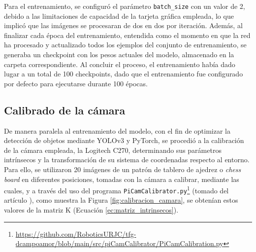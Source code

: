 Para el entrenamiento, se configuró el parámetro \verb|batch_size| con un valor de 2, debido a las limitaciones de capacidad de la tarjeta gráfica empleada, lo que implicó que las imágenes se procesaran de dos en dos por iteración. Además, al finalizar cada época del entrenamiento, entendida como el momento en que la red ha procesado y actualizado todos los ejemplos del conjunto de entrenamiento, se generaba un checkpoint con los pesos actuales del modelo, almacenado en la carpeta correspondiente. Al concluir el proceso, el entrenamiento había dado lugar a un total de 100 checkpoints, dado que el entrenamiento fue configurado por defecto para ejecutarse durante 100 épocas.

\subsection{Calibrado de la cámara}
\label{sec:Calibrado_camara}

De manera paralela al entrenamiento del modelo, con el fin de optimizar la detección de objetos mediante YOLOv3 y PyTorch, se procedió a la calibración de la cámara empleada, la Logitech C270, determinando sus parámetros intrínsecos y la transformación de su sistema de coordenadas respecto al entorno. Para ello, se utilizaron 20 imágenes de un patrón de tablero de ajedrez o \textit{chess board} en diferentes posiciones, tomadas con la cámara a calibrar, mediante las cuales, y a través del uso del programa \verb|PiCamCalibrator.py|\footnote{\url{https://github.com/RoboticsURJC/tfg-dcampoamor/blob/main/src/piCamCalibrator/PiCamCalibration.py}} (tomado del artículo \cite{Vega21}), como muestra la Figura \ref{fig:calibracion_camara}, se obtenían estos valores de la matriz K (Ecuación \ref{ec:matriz_intrinsecos}). 

